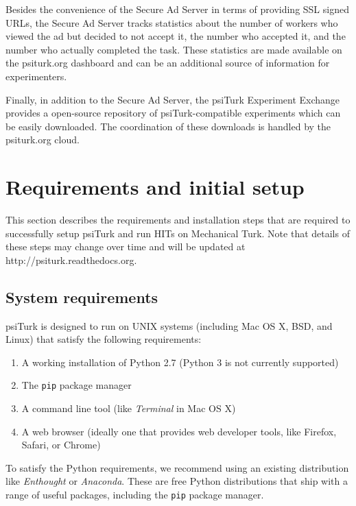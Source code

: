 \documentclass[twocolumn]{svjour3}          %
\newcommand{\psiturk}[0]{\textsf{psiTurk}}
\begin{document}
Besides the convenience of the Secure Ad Server in terms of providing
SSL signed URLs, the Secure Ad Server tracks statistics about the
number of workers who viewed the ad but decided to not accept it, the
number who accepted it, and the number who actually completed the task.
These statistics are made available on the \textsf{psiturk.org} dashboard
and can be an additional source of information for experimenters.

Finally, in addition to the Secure Ad Server, the \psiturk{} Experiment Exchange provides
a open-source repository of \psiturk{}-compatible experiments which can be 
easily downloaded.  The coordination of these downloads is handled by the \textsf{psiturk.org} cloud. 


\section{Requirements and initial setup}
This section describes the requirements and installation steps that are required to successfully setup \psiturk{} and run
HITs on Mechanical Turk. Note that details of these steps may change over time and will be updated at \textsf{http://psiturk.readthedocs.org}.

\subsection{System requirements}
\psiturk{} is designed to run on UNIX systems (including Mac OS X, BSD, and Linux) that satisfy the following requirements:

\begin{enumerate}
\item A working installation of Python 2.7 (Python 3 is not currently supported)
\item The \texttt{pip} package manager 
\item A command line tool (like \emph{Terminal} in Mac OS X)
\item A web browser (ideally one that provides web developer tools, like Firefox, Safari, or Chrome)
\end{enumerate}

To satisfy the Python requirements, we recommend using an existing distribution like \emph{Enthought} or \emph{Anaconda}. These are free
Python distributions that ship with a range of useful packages, including the \texttt{pip} package manager. 
\end{document}
